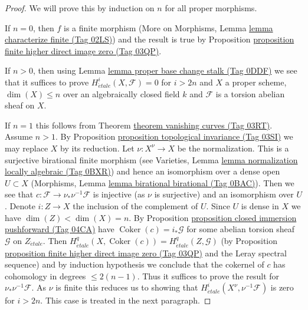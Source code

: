 \documentclass{amsart}
\theoremstyle{plain}
\theoremstyle{definition}
\theoremstyle{remark}
\numberwithin{equation}{subsection}
\def\etale{{\acute{e}tale}}
\def\Coker{\mathop{\mathrm{Coker}}}
\begin{document}
\begin{proof}
We will prove this by induction on $n$ for all proper morphisms.

\medskip\noindent
If $n = 0$, then $f$ is a finite morphism
(More on Morphisms, Lemma \href{https://stacks.math.columbia.edu/tag/02LS}{lemma characterize finite (Tag 02LS)})
and the
result is true by Proposition \href{https://stacks.math.columbia.edu/tag/03QP}{proposition finite higher direct image zero (Tag 03QP)}.

\medskip\noindent
If $n > 0$, then using Lemma \href{https://stacks.math.columbia.edu/tag/0DDF}{lemma proper base change stalk (Tag 0DDF)}
we see that it suffices to prove $H^i_\etale(X, \mathcal{F}) = 0$
for $i > 2n$ and $X$ a proper scheme, $\dim(X) \leq n$
over an algebraically closed field $k$
and $\mathcal{F}$ is a torsion abelian sheaf on $X$.

\medskip\noindent
If $n = 1$ this follows from Theorem \href{https://stacks.math.columbia.edu/tag/03RT}{theorem vanishing curves (Tag 03RT)}.
Assume $n > 1$. By Proposition \href{https://stacks.math.columbia.edu/tag/03SI}{proposition topological invariance (Tag 03SI)}
we may replace $X$ by its reduction.
Let $\nu : X^\nu \to X$ be the normalization.
This is a surjective birational finite morphism
(see Varieties, Lemma \href{https://stacks.math.columbia.edu/tag/0BXR}{lemma normalization locally algebraic (Tag 0BXR)})
and hence an isomorphism over a dense open $U \subset X$
(Morphisms, Lemma \href{https://stacks.math.columbia.edu/tag/0BAC}{lemma birational birational (Tag 0BAC)}).
Then we see that
$c : \mathcal{F} \to \nu_*\nu^{-1}\mathcal{F}$ is injective
(as $\nu$ is surjective) and an isomorphism over $U$.
Denote $i : Z \to X$ the inclusion of the complement of $U$.
Since $U$ is dense in $X$ we have $\dim(Z) < \dim(X) = n$.
By Proposition \href{https://stacks.math.columbia.edu/tag/04CA}{proposition closed immersion pushforward (Tag 04CA)} have
$\Coker(c) = i_*\mathcal{G}$ for some
abelian torsion sheaf $\mathcal{G}$ on $Z_\etale$.
Then $H^q_\etale(X, \Coker(c)) = H^q_\etale(Z, \mathcal{G})$
(by Proposition \href{https://stacks.math.columbia.edu/tag/03QP}{proposition finite higher direct image zero (Tag 03QP)}
and the Leray spectral sequence) and by induction hypothesis we conclude that
the cokernel of $c$ has cohomology in degrees $\leq 2(n - 1)$.
Thus it suffices to prove the result for $\nu_*\nu^{-1}\mathcal{F}$.
As $\nu$ is finite this reduces us to showing
that $H^i_\etale(X^\nu, \nu^{-1}\mathcal{F})$ is
zero for $i > 2n$. This case is treated in the next paragraph.


\end{proof}
\end{document}

